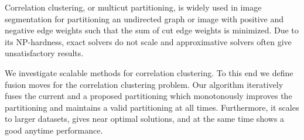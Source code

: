 Correlation clustering, or multicut partitioning,
is widely used in image segmentation for
partitioning an undirected graph or image with positive and negative edge weights 
such that the sum of cut edge weights is minimized.
%
Due to its NP-hardness, exact solvers do not scale and approximative solvers often give unsatisfactory results.

We investigate scalable methods for correlation clustering.
To this end we define fusion moves for the correlation clustering problem.
Our algorithm iteratively fuses the current and a proposed partitioning which  monotonously improves
the partitioning and maintains a valid partitioning at all times.
Furthermore, it scales to larger datasets, gives near optimal solutions, and at the same time shows
a good anytime performance.
